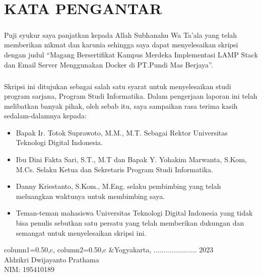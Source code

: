 \documentclass[../SKRIPSI_ALDZIKRI_DWIJAYANTO_PRATHAMA.tex]{subfiles}
\begin{document}
\chapter*{KATA PENGANTAR}
\begin{doublespace}
\paragraph*{}Puji syukur saya panjatkan kepada Allah
Subhanahu Wa Ta’ala yang telah memberikan nikmat dan
karunia sehingga saya dapat menyelesaikan skripsi dengan
judul “Magang Bersertifikat Kampus Merdeka Implementasi LAMP Stack dan Email Server Menggunakan Docker di PT.Pundi Mas Berjaya”.

\paragraph*{}Skripsi ini ditujukan sebagai salah satu syarat untuk
menyelesaikan studi program sarjana, Program Studi
Informatika. Dalam pengerjaan laporan ini telah  melibatkan
banyak pihak, oleh sebab itu, saya sampaikan rasa terima
kasih  sedalam-dalamnya kepada: \\
\begin{itemize}
  \item Bapak Ir. Totok Suprawoto, M.M., M.T. Sebagai Rektor
  Universitas Teknologi Digital Indonesia.
  \item Ibu Dini Fakta Sari, S.T., M.T dan Bapak Y. Yohakim Marwanta, S.Kom, M.Cs. Selaku Ketua dan Sekretaris Program Studi Informatika.
  \item Danny Kriestanto, S.Kom., M.Eng. selaku pembimbing yang
  telah meluangkan waktunya untuk membimbing saya.
  \item Teman-teman mahasiswa Universitas Teknologi Digital Indonesia yang tidak bisa penulis sebutkan satu persatu yang telah memberikan dukungan dan semangat untuk menyelesaikan skripsi ini.
\end{itemize}
\end{doublespace}
\begin{tblr}{column{1}={0.50\linewidth,c},
column{2}={0.50\linewidth,c}}
  &{Yogyakarta, ...................... 2023\\
    \vspace*{3cm}
    Aldzikri Dwijayanto Prathama\\
    NIM: 195410189}
\end{tblr}
\end{document}
